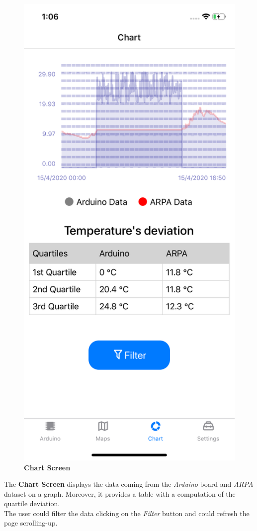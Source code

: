 \begin{figure}[H]
\centering
\includegraphics[height=.6\textheight]{./img/ui/chart.png}
\caption{\textbf{Chart Screen}}
\end{figure}
\begin{center}
The \textbf{Chart Screen} displays the data coming from the \textit{Arduino} board and \textit{ARPA} dataset on a graph. Moreover, it provides a table with a computation of the quartile deviation.\\
The user could filter the data clicking on the \textit{Filter} button and could refresh the page scrolling-up.
\end{center}


